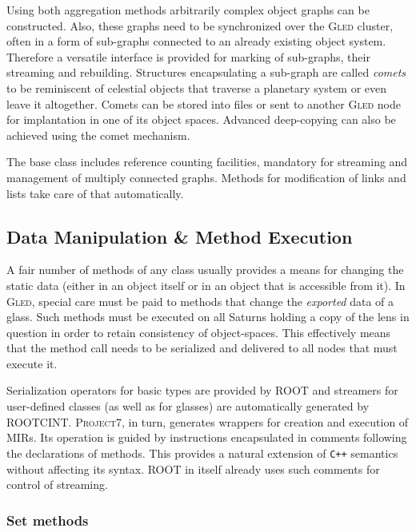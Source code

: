 \documentclass[a4paper,11pt]{article}
\def\gled{\textsc{Gled}\xspace}
\def\p7{\textsc{Project7}\xspace}
\def\smalltt#1{{\small\texttt{#1}}}
\begin{document}
Using both aggregation methods arbitrarily complex object graphs can
be constructed. Also, these graphs need to be synchronized over the
\gled cluster, often in a form of sub-graphs connected to an already
existing object system. Therefore a versatile interface is provided
for marking of sub-graphs, their streaming and rebuilding. Structures
encapsulating a sub-graph are called \emph{comets} to be reminiscent
of celestial objects that traverse a planetary system or even leave it
altogether. Comets can be stored into files or sent to another \gled
node for implantation in one of its object spaces. Advanced
deep-copying can also be achieved using the comet mechanism.

The base class includes reference counting facilities, mandatory for
streaming and management of multiply connected graphs. Methods for
modification of links and lists take care of that automatically.


\subsection{Data Manipulation \& Method Execution}

A fair number of methods of any class usually provides a means for
changing the static data (either in an object itself or in an object
that is accessible from it). In \gled, special care must be paid to
methods that change the \emph{exported} data of a glass. Such methods
must be executed on all Saturns holding a copy of the lens in question
in order to retain consistency of object-spaces. This effectively
means that the method call needs to be serialized and delivered to all
nodes that must execute it.

Serialization operators for basic types are provided by ROOT and
streamers for user-defined classes (as well as for glasses) are
automatically generated by ROOTCINT. \p7, in turn, generates wrappers
for creation and execution of MIRs. Its operation is guided by
instructions encapsulated in comments following the declarations of
methods. This provides a natural extension of \smalltt{C++} semantics
without affecting its syntax. ROOT in itself already uses such
comments for control of streaming.

\subsubsection{Set methods} 
\end{document}

